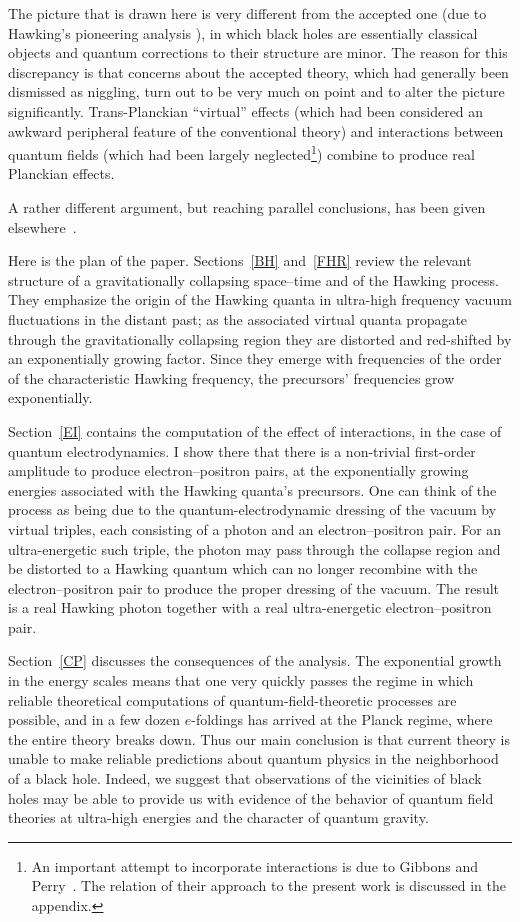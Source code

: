 \documentclass[12pt]{article}
\begin{document}
The picture that is drawn here is very different from the accepted one (due to
Hawking's pioneering analysis \cite{Hawking:1974,Hawking:1975,Helfer:2003}), 
in which black holes are essentially classical objects and quantum corrections
to their structure are minor.  The reason for this discrepancy is that concerns
about the accepted theory, which had generally been dismissed as niggling, turn
out to be very much on point and to alter the picture significantly.
Trans-Planckian ``virtual'' effects (which had been considered an awkward
peripheral feature of the conventional theory) and interactions between quantum
fields (which had been largely neglected\footnote{An important attempt to
incorporate interactions is due to Gibbons and Perry~\cite{GP:1976}.  The
relation of their approach to the present work is discussed in the appendix.})
combine to produce real Planckian effects.

A rather different argument, but reaching parallel conclusions, has been given
elsewhere~\cite{Helfer:2004}.

Here is the plan of the paper.  Sections~\ref{BH} and~\ref{FHR} review the
relevant structure of a gravitationally collapsing space--time and of the
Hawking process.  They emphasize the origin of the Hawking quanta in ultra-high
frequency vacuum fluctuations in the distant past; as the associated virtual
quanta propagate through the gravitationally collapsing region they are
distorted and red-shifted by an exponentially growing factor.  Since they
emerge with frequencies of the order of the characteristic Hawking frequency,
the precursors' frequencies grow exponentially.  

Section~\ref{EI} contains the computation of the effect of interactions, in the
case of quantum electrodynamics.  I show there that there is a non-trivial
first-order amplitude to produce  electron--positron pairs, at the
exponentially growing energies associated with the Hawking quanta's
precursors.  One can think of the process as being due to the
quantum-electrodynamic dressing of the vacuum by virtual triples, each
consisting of a photon and an electron--positron pair.  For an ultra-energetic
such triple, the photon may pass through the collapse region and be distorted
to a Hawking quantum which can no longer recombine with the electron--positron
pair to produce the proper dressing of the vacuum.  The result is a real
Hawking photon together with a real ultra-energetic electron--positron pair.

Section~\ref{CP} discusses the consequences of the analysis.  The exponential
growth in the energy scales means that one very quickly passes the regime in
which reliable theoretical computations of quantum-field-theoretic processes
are possible, and in a few dozen $e$-foldings has arrived at the Planck regime,
where the entire theory breaks down.  Thus our main conclusion is that current
theory is unable to make reliable predictions about quantum physics in the
neighborhood of a black hole.  Indeed, we suggest that observations of the
vicinities of black holes may be able to provide us with evidence of the
behavior of quantum field theories at ultra-high energies and the character of
quantum gravity.
\end{document}
